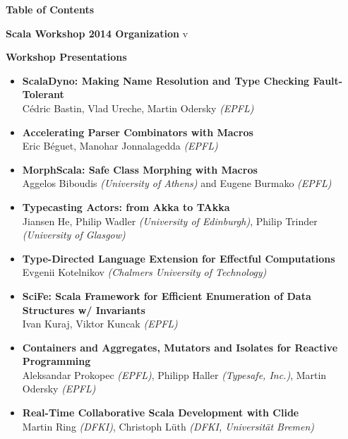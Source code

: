 \documentclass[10pt]{book}
\title{}
\date{}
\begin{document}
\thispagestyle{empty}


{\centering \LARGE \bf Table of Contents\par}

\vspace{0.5cm}
\large \textbf{Scala Workshop 2014 Organization}  v
\normalsize

\vspace{0.5cm}
\large \textbf{Workshop Presentations}
\normalsize
\begin{itemize}
\item {\bf ScalaDyno: Making Name Resolution and Type Checking Fault-Tolerant} \\
C\'{e}dric Bastin, Vlad Ureche, Martin Odersky {\em (EPFL)}
\item {\bf Accelerating Parser Combinators with Macros} \\
Eric B\'{e}guet, Manohar Jonnalagedda {\em (EPFL)}
\item {\bf MorphScala: Safe Class Morphing with Macros} \\
Aggelos Biboudis {\em (University of Athens)} and Eugene Burmako {\em (EPFL)}
\item {\bf Typecasting Actors: from Akka to TAkka} \\
Jiansen He, Philip Wadler {\em (University of Edinburgh)}, Philip Trinder {\em (University of Glasgow)}
\item {\bf Type-Directed Language Extension for Effectful Computations} \\
Evgenii Kotelnikov {\em (Chalmers University of Technology)}
\item {\bf SciFe: Scala Framework for Efficient Enumeration of Data Structures w/ Invariants} \\
Ivan Kuraj, Viktor Kuncak {\em (EPFL)}
\item {\bf Containers and Aggregates, Mutators and Isolates for Reactive Programming} \\
Aleksandar Prokopec {\em(EPFL)}, Philipp Haller {\em(Typesafe, Inc.)}, Martin Odersky {\em(EPFL)}
\item {\bf Real-Time Collaborative Scala Development with Clide} \\
Martin Ring {\em(DFKI)}, Christoph L\"{u}th {\em(DFKI, Universit\"{a}t Bremen)}
\end{itemize}
\end{document}
